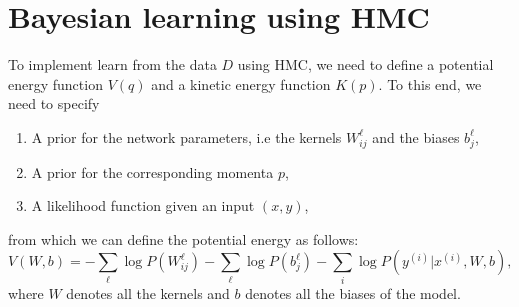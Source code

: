 \section{Bayesian learning using HMC}
To implement learn from the data $D$ using HMC, we need to define a potential energy function $V(q)$ 
and a kinetic energy function $K(p)$. To this end, we need to specify
\begin{enumerate}
  \item A prior for the network parameters, i.e the kernels $W_{ij}^\ell$ and the biases $b_j^{\ell}$,
  \item A prior for the corresponding momenta $p$,
  \item A likelihood function given an input $(x, y)$,
\end{enumerate}
from which we can define the potential energy as follows:
\begin{equation}
  V(W, b) = - \sum_{\ell}\log P(W_{ij}^\ell) - \sum_{\ell}\log P(b_j^\ell) - \sum_i \log P(y^{(i)}| x^{(i)}, W, b), 
\end{equation}
where $W$ denotes all the kernels and $b$ denotes all the biases of the model.
